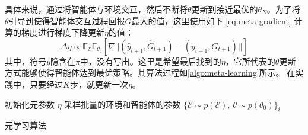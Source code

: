 具体来说，通过将智能体与环境交互，然后不断将$\theta$更新到接近最优的$\theta_N$。为了将$\theta$引导到使得智能体交互过程回报$G$最大的值，这里使用如下 \autoref{eq:meta-gradient} 计算的梯度进行梯度下降更新$\eta$的值：
\begin{equation}
    \Delta \eta  \varpropto \mathbb{E}_{\mathcal{E}} \mathbb{E}_{\theta_0} \left[ \nabla  || (\hat{y}_{t+1}, \hat{G}_{t+1}) - (y_{t+1}, G_{t+1})||  \right]
    \label{eq:meta-gradient}
\end{equation}
其中，符号$y$隐含在$\pi$中，没有写出。这里是希望最后找到的$\eta$，它所代表的$\theta$更新方式能够使得智能体达到最优策略。其算法过程如\autoref{algo:meta-learning}所示。 在实践中，只要经过$K$步，就更新一次$\eta$。

\begin{algorithm}[h!]
    
    初始化元参数 $\eta$
    采样批量的环境和智能体的参数 $\{ \mathcal{E} \sim p(\mathcal{E}), \ \theta \sim p(\theta_0)\}_i$

     {
    }
    \caption{元学习算法}
    \label{algo:meta-learning}
\end{algorithm}

